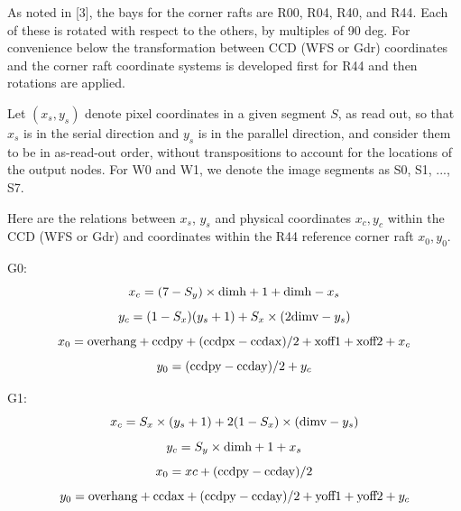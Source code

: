 \documentclass{article}[12pt]
\newcommand{\red}{\textcolor{red}}
\begin{document}
{%

As noted in [3], the bays for the corner rafts are R00, R04, R40, and R44.  Each of these is rotated with respect to the others, by multiples of 90 deg.  For convenience below the transformation between CCD (WFS or Gdr) coordinates and the corner raft coordinate systems is developed first for R44 and then rotations are applied.

Let $(x_s, y_s)$ denote pixel coordinates in a given segment $S$, as read out, so that $x_s$ is in the serial direction and $y_s$ is in the parallel direction, and consider them to be in as-read-out order, without transpositions to account for the locations of the output nodes.  For W0 and W1, we denote the image segments as S0, S1, ..., S7.  

Here are the relations between $x_s$, $y_s$ and physical coordinates $x_c, y_c$ within the CCD (WFS or Gdr) and coordinates within the R44 reference corner raft $x_0, y_0$.

G0:
\begin{equation}
x_c = (7 - S_y) \times {\rm dimh} + 1 + {\rm dimh} - x_s
\end{equation}
\begin{equation}
y_c = (1 - S_x) ( y_s + 1) +  S_x \times ({2\rm dimv} - y_s)   %
\end{equation}
\begin{equation}
x_0 = {\rm overhang} + {\rm ccdpy} + ({\rm ccdpx} - {\rm ccdax})/2  + {\rm xoff1} + {\rm xoff2} + x_c
\end{equation}
\begin{equation}
y_0 = ({\rm ccdpy} - {\rm ccday})/2 + y_c
\end{equation}

G1:
\begin{equation}
x_c =  S_x \times (y_s + 1) + 2(1 - S_x) \times ({\rm dimv} - y_s)
\end{equation}
\begin{equation}
y_c = S_y \times {\rm dimh} + 1  + x_s
\end{equation}
\begin{equation}
x_0 = xc + ({\rm ccdpy} - {\rm ccday})/2
\end{equation}
\begin{equation}
y_0 = {\rm overhang} + {\rm ccdax} + ({\rm ccdpy} - {\rm ccday})/2 + {\rm yoff1} + {\rm yoff2} + y_c
\end{equation}

}
\end{document}
